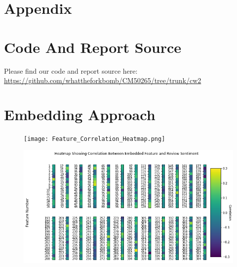 
\section*{\Large Appendix}
\appendix

\section{Code And Report Source}
Please find our code and report source here: \url{https://github.com/whattheforkbomb/CM50265/tree/trunk/cw2}

\section{Embedding Approach}
\begin{figure}[h]
    \texttt{[image: Feature\_Correlation\_Heatmap.png]}
\end{figure}
\begin{figure}[h]
    \includegraphics[width=\textwidth]{figures/Feature_Correlation_Heatmap_Non_Trunkated_Embedding.png}
\end{figure}

